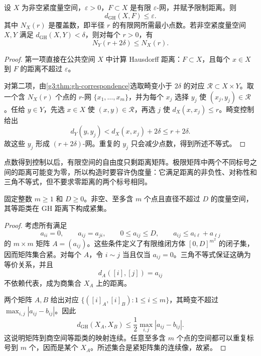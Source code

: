 \begin{proposition}\label{g3:prop:finite-net-gh-bound}
	设 \(X\) 为非空紧度量空间，\(\varepsilon>0\)，\(F\subset X\) 是有限 \(\varepsilon\)-网，并赋予限制距离。则
	\[
		d_{\mathrm{GH}}(X,F)\le\varepsilon.
	\]
	其中 \(N_X(r)\) 是覆盖数，即半径 \(r\) 的有限网所需最小点数。若非空紧度量空间 \(X,Y\) 满足 \(d_{\mathrm{GH}}(X,Y)<\delta\)，则对每个 \(r>0\)，有
	\begin{equation}\label{g3:eq:covering-number-transfer}
		N_Y(r+2\delta)\le N_X(r).
	\end{equation}
\end{proposition}
\begin{proof}
	第一项直接在公共空间 \(X\) 中计算 Hausdorff 距离：\(F\subset X\)，且每个 \(x\in X\) 到 \(F\) 的距离不超过 \(\varepsilon\)。

	对第二项，由\cref{g3:thm:gh-correspondence}选取畸变小于 \(2\delta\) 的对应 \(\mathcal R\subset X\times Y\)。取一个含 \(N_X(r)\) 个点的 \(r\)-网 \(\{x_1,\ldots,x_m\}\)，并为每个 \(x_j\) 选择 \(y_j\) 使 \((x_j,y_j)\in\mathcal R\)。任给 \(y\in Y\)，先选 \(x\in X\) 使 \((x,y)\in\mathcal R\)，再选 \(j\) 使 \(d_X(x,x_j)\le r\)。畸变控制给出
	\[
		d_Y(y,y_j)<d_X(x,x_j)+2\delta\le r+2\delta.
	\]
	故这些 \(y_j\) 形成 \((r+2\delta)\)-网。重复的 \(y_j\) 只会减少点数，得到所述不等式。
\end{proof}

点数得到控制以后，有限空间的自由度只剩距离矩阵。极限矩阵中两个不同标号之间的距离可能变为零，所以构造时要容许伪度量：它满足距离的非负性、对称性和三角不等式，但不要求零距离的两个标号相同。

\begin{proposition}\label{g3:prop:finite-metric-matrices}
	固定整数 \(m\ge1\) 和 \(D\ge0\)。非空、至多含 \(m\) 个点且直径不超过 \(D\) 的度量空间，其等距类在 GH 距离下构成紧集。
\end{proposition}
\begin{proof}
	考虑所有满足
	\[
		a_{ii}=0,\qquad a_{ij}=a_{ji},\qquad
		0\le a_{ij}\le D,\qquad a_{ij}\le a_{i\ell}+a_{\ell j}
	\]
	的 \(m\times m\) 矩阵 \(A=(a_{ij})\)。这些条件定义了有限维闭方体 \([0,D]^{m^2}\) 的闭子集，因而矩阵集合紧。对每个 \(A\)，令 \(i\sim j\) 当且仅当 \(a_{ij}=0\)。三角不等式保证这确为等价关系，并且
	\[
		d_A([i],[j])=a_{ij}
	\]
	不依赖代表，成为商集合 \(X_A\) 上的距离。

	两个矩阵 \(A,B\) 给出对应
	\(\{([i]_A,[i]_B):1\le i\le m\}\)，其畸变不超过
	\(\max_{i,j}|a_{ij}-b_{ij}|\)。因此
	\begin{equation}\label{g3:eq:matrix-gh-bound}
		d_{\mathrm{GH}}(X_A,X_B)
		\le\frac12\max_{i,j}|a_{ij}-b_{ij}|.
	\end{equation}
	这说明矩阵到商空间等距类的映射连续。任意至多含 \(m\) 个点的空间都可以重复标号到 \(m\) 个，因而是某个 \(X_A\)。所述集合是紧矩阵集的连续像，故紧。
\end{proof}

